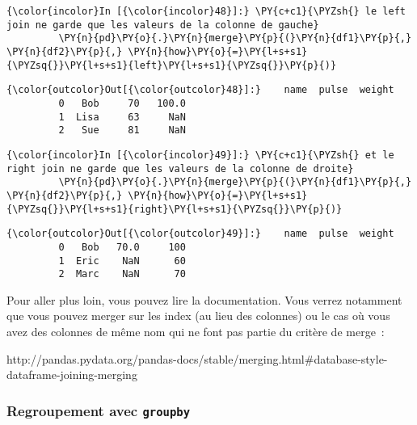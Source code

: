     \begin{Verbatim}[commandchars=\\\{\}]
{\color{incolor}In [{\color{incolor}48}]:} \PY{c+c1}{\PYZsh{} le left join ne garde que les valeurs de la colonne de gauche}
         \PY{n}{pd}\PY{o}{.}\PY{n}{merge}\PY{p}{(}\PY{n}{df1}\PY{p}{,} \PY{n}{df2}\PY{p}{,} \PY{n}{how}\PY{o}{=}\PY{l+s+s1}{\PYZsq{}}\PY{l+s+s1}{left}\PY{l+s+s1}{\PYZsq{}}\PY{p}{)}
\end{Verbatim}


\begin{Verbatim}[commandchars=\\\{\}]
{\color{outcolor}Out[{\color{outcolor}48}]:}    name  pulse  weight
         0   Bob     70   100.0
         1  Lisa     63     NaN
         2   Sue     81     NaN
\end{Verbatim}
            
    \begin{Verbatim}[commandchars=\\\{\}]
{\color{incolor}In [{\color{incolor}49}]:} \PY{c+c1}{\PYZsh{} et le right join ne garde que les valeurs de la colonne de droite}
         \PY{n}{pd}\PY{o}{.}\PY{n}{merge}\PY{p}{(}\PY{n}{df1}\PY{p}{,} \PY{n}{df2}\PY{p}{,} \PY{n}{how}\PY{o}{=}\PY{l+s+s1}{\PYZsq{}}\PY{l+s+s1}{right}\PY{l+s+s1}{\PYZsq{}}\PY{p}{)}
\end{Verbatim}


\begin{Verbatim}[commandchars=\\\{\}]
{\color{outcolor}Out[{\color{outcolor}49}]:}    name  pulse  weight
         0   Bob   70.0     100
         1  Eric    NaN      60
         2  Marc    NaN      70
\end{Verbatim}
            
    Pour aller plus loin, vous pouvez lire la documentation. Vous verrez
notamment que vous pouvez merger sur les index (au lieu des colonnes) ou
le cas où vous avez des colonnes de même nom qui ne font pas partie du
critère de merge~:

http://pandas.pydata.org/pandas-docs/stable/merging.html\#database-style-dataframe-joining-merging

    \hypertarget{regroupement-avec-groupby}{%
\subsubsection{\texorpdfstring{Regroupement avec
\texttt{groupby}}{Regroupement avec groupby}}\label{regroupement-avec-groupby}}

